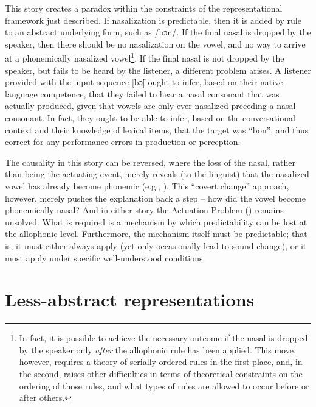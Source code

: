 This story creates a paradox within the constraints of the representational
framework just described. If nasalization is predictable, then it
is added by rule to an abstract underlying form, such as {/bɔn/}.
If the final nasal is dropped by the speaker, then there should be
no nasalization on the vowel, and no way to arrive at a phonemically
nasalized vowel\footnote{In fact, it is possible to achieve the necessary outcome if the nasal
is dropped by the speaker only \emph{after} the allophonic rule has
been applied. This move, however, requires a theory of serially ordered
rules in the first place, and, in the second, raises other difficulties
in terms of theoretical constraints on the ordering of those rules,
and what types of rules are allowed to occur before or after others.}. If the final nasal is not dropped by the speaker, but fails to be
heard by the listener, a different problem arises. A listener provided
with the input sequence {[bɔ̃]} ought to infer, based on
their native language competence, that they failed to hear a nasal
consonant that was actually produced, given that vowels are only ever
nasalized preceding a nasal consonant. In fact, they ought to be able
to infer, based on the conversational context and their knowledge
of lexical items, that the target was “bon”, and thus correct
for any performance errors in production or perception.

The causality in this story can be reversed, where the loss of the
nasal, rather than being the actuating event, merely reveals (to the
linguist) that the nasalized vowel has already become phonemic (e.g.,
\citealt{Janda2003}). This ``covert change'' approach, however, merely
pushes the explanation back a step – how did the vowel become phonemically
nasal? And in either story the Actuation Problem (\citealt{Labov1968})
remains unsolved. What is required is a mechanism by which predictability
can be lost at the allophonic level. Furthermore, the mechanism itself
must be predictable; that is, it must either always apply (yet only
occasionally lead to sound change), or it must apply under specific
well-understood conditions.

\section{\label{sec:Less-abstract-Representations}Less-abstract representations}


